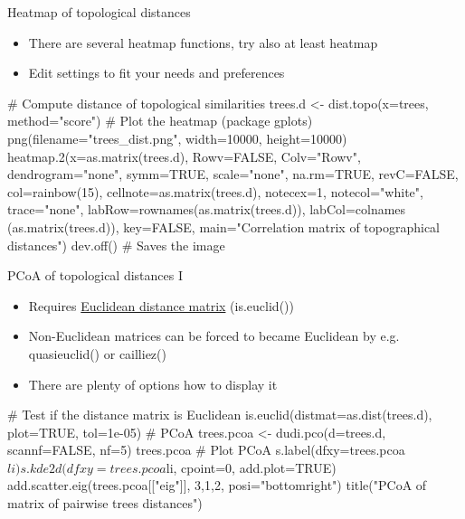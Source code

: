 \documentclass[compress, ucs, xelatex, 11pt, xcolor=x11names, aspectratio=169,
	hyperref={
		bookmarks=true,
		unicode=true,
		colorlinks=true,
		pdftitle={HybSeq course},
		plainpages=false,
		pdfauthor={Vojtech Zeisek},
		pdfsubject={Practical processing of HybSeq target enrichment sequencing data on computing grids like MetaCentrum},
		pdfcreator={XeLaTeX},
		pdfkeywords={BASH, command line, GNU, HybSeq, Linux, MetaCentrum, sequencing shell, target enrichment},
		linkcolor=Turquoise4, %
		anchorcolor=DodgerBlue4, %
		citecolor=DodgerBlue4, %
		filecolor=DodgerBlue4, %
		menucolor=Tan4, %
		urlcolor=DarkOliveGreen4, %
		pdftex},
	url={hyphens, lowtilde} %
	]{beamer}
\renewcommand{\texttt}[1]{\colorbox{Cornsilk2}{{\ttfamily #1}}}
\begin{document}
\begin{frame}[fragile]{Heatmap of topological distances}
	\begin{itemize}
		\item There are several heatmap functions, try also at least \texttt{heatmap}
		\item Edit settings to fit your needs and preferences
	\end{itemize}
	\begin{spluscode}
    # Compute distance of topological similarities
    trees.d <- dist.topo(x=trees, method="score")
    # Plot the heatmap (package gplots)
    png(filename="trees_dist.png", width=10000, height=10000)
      heatmap.2(x=as.matrix(trees.d), Rowv=FALSE, Colv="Rowv",
        dendrogram="none", symm=TRUE, scale="none", na.rm=TRUE,
        revC=FALSE, col=rainbow(15), cellnote=as.matrix(trees.d),
        notecex=1, notecol="white", trace="none",
        labRow=rownames(as.matrix(trees.d)), labCol=colnames
        (as.matrix(trees.d)), key=FALSE, main="Correlation
        matrix of topographical distances")
      dev.off() # Saves the image
	\end{spluscode}
\end{frame}

\begin{frame}[fragile]{PCoA of topological distances I}
	\begin{itemize}
		\item Requires \href{https://en.wikipedia.org/wiki/Euclidean_distance_matrix}{Euclidean distance matrix} (\texttt{is.euclid()})
		\item Non-Euclidean matrices can be forced to became Euclidean by e.g. \texttt{quasieuclid()} or \texttt{cailliez()}
		\item There are plenty of options how to display it
	\end{itemize}
	\begin{spluscode}
    # Test if the distance matrix is Euclidean
    is.euclid(distmat=as.dist(trees.d), plot=TRUE, tol=1e-05)
    # PCoA
    trees.pcoa <- dudi.pco(d=trees.d, scannf=FALSE, nf=5)
    trees.pcoa
    # Plot PCoA
    s.label(dfxy=trees.pcoa$li)
    s.kde2d(dfxy=trees.pcoa$li, cpoint=0, add.plot=TRUE)
    add.scatter.eig(trees.pcoa[["eig"]], 3,1,2, posi="bottomright")
    title("PCoA of matrix of pairwise trees distances")
	\end{spluscode}
\end{frame}
\end{document}

